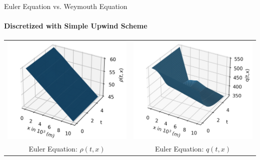 \documentclass[8pt]{beamer}
\begin{document}
\begin{frame}{Euler Equation vs. Weymouth Equation}
\framesubtitle{Discretized with Simple Upwind Scheme}
\begin{center}
\begin{tabular}{cc}
  \includegraphics[height=0.3\textheight]{images/Euler_Simpl_P.png}
  &
  \includegraphics[height=0.3\textheight]{images/Euler_Simpl_Q_new.png}
   \\                                                     
Euler Equation: $\rho(t,x)$ & Euler Equation: $q(t,x)$
 \end{tabular}

\end{center}
\end{frame}
\end{document}
